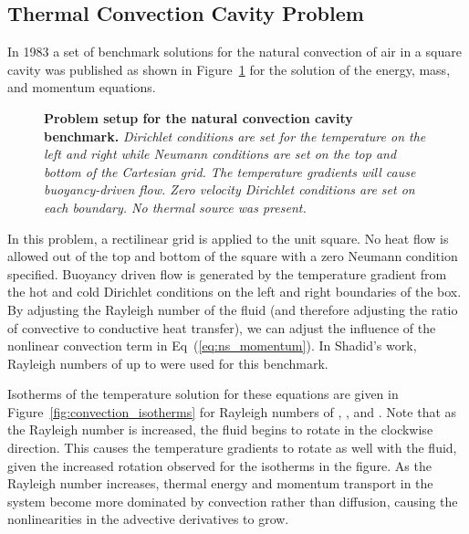\subsection{Thermal Convection Cavity Problem}
\label{subsec:natural_convection_cavity}
In 1983 a set of benchmark solutions for the natural convection of air
in a square cavity was published \citep{de_vahl_davis_natural_1983} as
shown in Figure~\ref{fig:natural_convection_cavity} for the solution
of the energy, mass, and momentum equations.

\begin{figure}[t!]
  \begin{center}
    \scalebox{1.5}{
       }
  \end{center}
  \caption{\textbf{Problem setup for the natural convection cavity
      benchmark.} \textit{Dirichlet conditions are set for the
      temperature on the left and right while Neumann conditions are
      set on the top and bottom of the Cartesian grid. The temperature
      gradients will cause buoyancy-driven flow. Zero velocity
      Dirichlet conditions are set on each boundary. No thermal source
      was present.}}
  \label{fig:natural_convection_cavity}
\end{figure}

In this problem, a rectilinear grid is applied to the unit square. No
heat flow is allowed out of the top and bottom of the square with a
zero Neumann condition specified. Buoyancy driven flow is generated by
the temperature gradient from the hot and cold Dirichlet conditions on
the left and right boundaries of the box. By adjusting the Rayleigh
number of the fluid (and therefore adjusting the ratio of convective
to conductive heat transfer), we can adjust the influence of the
nonlinear convection term in Eq~(\ref{eq:ns_momentum}). In Shadid's
work, Rayleigh numbers of up to  were used for this benchmark.

Isotherms of the temperature solution for these equations are given in
Figure~\ref{fig:convection_isotherms} for Rayleigh numbers of
, ,  and . Note that as the
Rayleigh number is increased, the fluid begins to rotate in the
clockwise direction. This causes the temperature gradients to rotate
as well with the fluid, given the increased rotation observed for the
isotherms in the figure. As the Rayleigh number increases, thermal
energy and momentum transport in the system become more dominated by
convection rather than diffusion, causing the nonlinearities in the
advective derivatives to grow.

